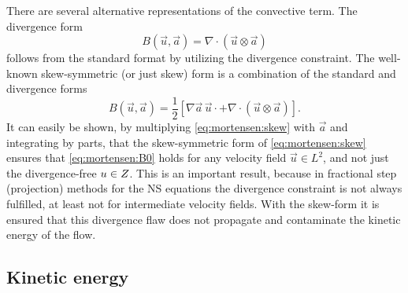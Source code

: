 There are several alternative representations of the convective
term. The divergence form
\begin{equation}
B(\vec{u},\vec{a})=\nabla \cdot (\vec{u} \otimes \vec{a})
\end{equation}
follows from the standard format by utilizing the divergence
constraint. The well-known skew-symmetric (or just skew) form is
a combination of the standard and divergence forms
\begin{equation}
 B(\vec{u},\vec{a}) = \frac{1}{2}\left[ \nabla \vec{a} \, \vec{u}\cdot
          + \nabla \cdot (\vec{u} \otimes \vec{a}) \right].
\label{eq:mortensen:skew}
\end{equation}
It can easily be shown, by multiplying \eqref{eq:mortensen:skew} with
$\vec{a}$ and integrating by parts, that the skew-symmetric form of
\eqref{eq:mortensen:skew} ensures that \eqref{eq:mortensen:B0} holds
for any velocity field $\vec{u} \in L^2$, and not just the
divergence-free ${u} \in Z$.
This is an important result, because in
fractional step (projection) methods for the NS equations the divergence
constraint is not always fulfilled, at least not for intermediate velocity
fields. With the skew-form it is ensured that this divergence flaw does
not propagate and contaminate the kinetic energy
of the flow.

\subsection{Kinetic energy}
\label{sec:mortensen:kinetic}

